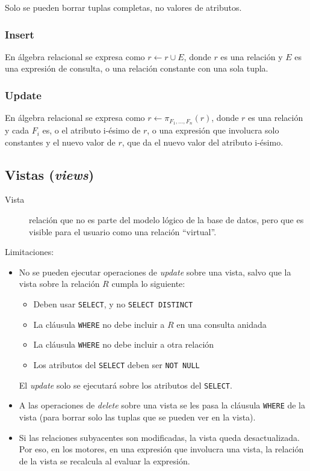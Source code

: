 \documentclass[a4paper, twoside]{article}
\newcommand{\codedir}{../resources/code} %
\begin{document}
Solo se pueden borrar tuplas completas, no valores de atributos.

\subsubsection{Insert}
En álgebra relacional se expresa como $r\leftarrow r\cup E$, donde $r$ es una relación y $E$ es una expresión de consulta, o una relación constante con una sola tupla.

\subsubsection{Update}
En álgebra relacional se expresa como $r\leftarrow\pi_{F_{1},\dots,F_{n}}(r)$, donde $r$ es una relación y cada $F_{i}$ es, o el atributo i-ésimo de $r$, o una expresión que involucra solo constantes y el nuevo valor de $r$, que da el nuevo valor del atributo i-ésimo.

\subsection{Vistas (\emph{views})}
\begin{description}
	\item[Vista] relación que no es parte del modelo lógico de la base de datos, pero que es visible para el usuario como una relación ``virtual''.
\end{description}



Limitaciones:
\begin{itemize}
	\item No se pueden ejecutar operaciones de \emph{update} sobre una vista, salvo que la vista sobre la relación $R$ cumpla lo siguiente:
	\begin{itemize}
		\item Deben usar \texttt{SELECT}, y no \texttt{SELECT DISTINCT}
		\item La cláusula \texttt{WHERE} no debe incluir a $R$ en una consulta anidada
		\item La cláusula \texttt{WHERE} no debe incluir a otra relación
		\item Los atributos del \texttt{SELECT} deben ser \texttt{NOT NULL}
	\end{itemize}

	El \emph{update} solo se ejecutará sobre los atributos del \texttt{SELECT}.

	\item A las operaciones de \emph{delete} sobre una vista se les pasa la cláusula \texttt{WHERE} de la vista (para borrar solo las tuplas que se pueden ver en la vista).

	\item Si las relaciones subyacentes son modificadas, la vista queda desactualizada. Por eso, en los motores, en una expresión que involucra una vista, la relación de la vista se recalcula al evaluar la expresión.
\end{itemize}
\end{document}
